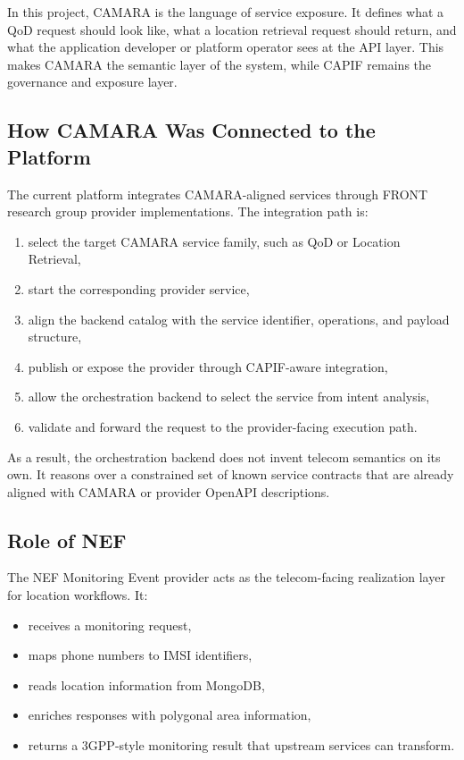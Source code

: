\documentclass[conference]{IEEEtran}
\begin{document}
In this project, CAMARA is the language of service exposure. It defines what a QoD request should look like, what a location retrieval request should return, and what the application developer or platform operator sees at the API layer. This makes CAMARA the semantic layer of the system, while CAPIF remains the governance and exposure layer.

\subsection{How CAMARA Was Connected to the Platform}

The current platform integrates CAMARA-aligned services through FRONT research group provider implementations. The integration path is:

\begin{enumerate}[leftmargin=1.1em]
\item select the target CAMARA service family, such as QoD or Location Retrieval,
\item start the corresponding provider service,
\item align the backend catalog with the service identifier, operations, and payload structure,
\item publish or expose the provider through CAPIF-aware integration,
\item allow the orchestration backend to select the service from intent analysis,
\item validate and forward the request to the provider-facing execution path.
\end{enumerate}

As a result, the orchestration backend does not invent telecom semantics on its own. It reasons over a constrained set of known service contracts that are already aligned with CAMARA or provider OpenAPI descriptions.

\subsection{Role of NEF}

The NEF Monitoring Event provider acts as the telecom-facing realization layer for location workflows. It:

\begin{itemize}[leftmargin=1.1em]
\item receives a monitoring request,
\item maps phone numbers to IMSI identifiers,
\item reads location information from MongoDB,
\item enriches responses with polygonal area information,
\item returns a 3GPP-style monitoring result that upstream services can transform.
\end{itemize}
\end{document}
